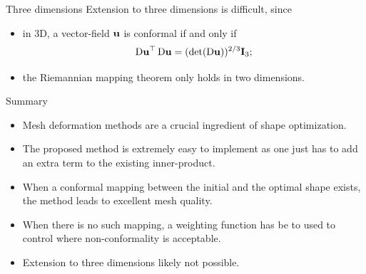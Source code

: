 \documentclass[aspectratio=1610]{beamer}
\newcommand{\includemovie}[2][]{
    \includemedia[
    #1,
    activate=pageopen,transparent,
    addresource=#2.mp4,addresource=#2.png,
    flashvars={
        file=#2.mp4&image=#2.png&
        stretching=uniform&start=0&
        screencolor=white& %
        controlbar.position=over&controlbar.idlehide=true&
        autostart=true&repeat=always&smoothing=true
    }
    ]{
            \texttt{[image: \#2]}
    }{player.swf}
}
\begin{document}
\begin{frame}[b]
    \begin{adjustwidth}{-6em}{-6em}
        \begin{figure}
            \begin{center}
                \includemovie[width=0.99\paperwidth]{./img/navierstokes-channel}
            \end{center}
        \end{figure}
    \end{adjustwidth}
\end{frame}
\begin{frame}{Three dimensions}
    Extension to three dimensions is difficult, since
    \begin{itemize}
        \item in 3D, a vector-field $\mathbf{u}$ is conformal if and only if 
        \begin{equation}
            \operatorname{D}\!{\mathbf{u}}^\top\operatorname{D}\!{\mathbf{u}} = (\mathrm{det}(\operatorname{D}\!{\mathbf{u}}))^{2/3} \mathbf{I}_3;
        \end{equation}
        \item the Riemannian mapping theorem only holds in two dimensions.
    \end{itemize}
\end{frame}
\begin{frame}{Summary}
    \begin{itemize}
        \item Mesh deformation methods are a crucial ingredient of shape optimization.
        \item The proposed method is extremely easy to implement as one just has to add an extra term to the existing inner-product.
        \item When a conformal mapping between the initial and the optimal shape exists, the method leads to excellent mesh quality.
        \item When there is no such mapping, a weighting function has be to used to control where non-conformality is acceptable.
        \item Extension to three dimensions likely not possible.
    \end{itemize}


\end{frame}
\end{document}
